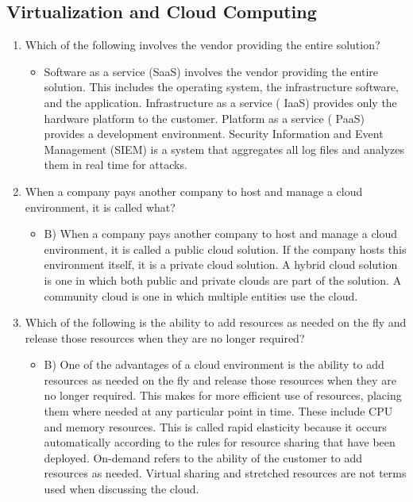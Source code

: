 \documentclass{article}
\begin{document}
\subsection{Virtualization and Cloud Computing}
\begin{enumerate}
    \item Which of the following involves the vendor providing the entire solution?
    \begin{itemize}
        \item Software as a service (SaaS) involves the vendor providing the entire solution. This
includes the operating system, the infrastructure software, and the application. Infrastructure
as a service ( IaaS) provides only the hardware platform to the customer. Platform as a service
( PaaS) provides a development environment. Security Information and Event Management
(SIEM) is a system that aggregates all log files and analyzes them in real time for attacks.
    \end{itemize}
    \item When a company pays another company to host and manage a cloud environment, it is
called what?
    \begin{itemize}
        \item B) When a company pays another company to host and manage a cloud environment, it is
called a public cloud solution. If the company hosts this environment itself, it is a private
cloud solution. A hybrid cloud solution is one in which both public and private clouds are
part of the solution. A community cloud is one in which multiple entities use the cloud.
    \end{itemize}
    \item Which of the following is the ability to add resources as needed on the fly and release those resources when they are no longer required?
    \begin{itemize}
        \item B) One of the advantages of a cloud environment is the ability to add resources as needed
on the fly and release those resources when they are no longer required. This makes for
more efficient use of resources, placing them where needed at any particular point in
time. These include CPU and memory resources. This is called rapid elasticity because it
occurs automatically according to the rules for resource sharing that have been deployed.
On-demand refers to the ability of the customer to add resources as needed. Virtual sharing
and stretched resources are not terms used when discussing the cloud.

\end{itemize}
\end{enumerate}
\end{document}
